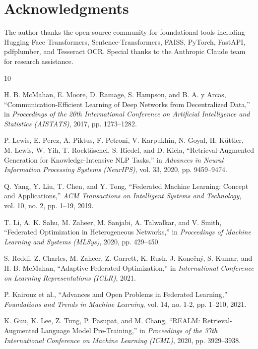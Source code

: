 \documentclass[conference]{IEEEtran}
\begin{document}
\section*{Acknowledgments}

The author thanks the open-source community for foundational tools including Hugging Face Transformers, Sentence-Transformers, FAISS, PyTorch, FastAPI, pdfplumber, and Tesseract OCR. Special thanks to the Anthropic Claude team for research assistance.

\begin{thebibliography}{10}

H. B. McMahan, E. Moore, D. Ramage, S. Hampson, and B. A. y Arcas,
``Communication-Efficient Learning of Deep Networks from Decentralized Data,''
in \textit{Proceedings of the 20th International Conference on Artificial Intelligence and Statistics (AISTATS)}, 2017, pp. 1273--1282.

P. Lewis, E. Perez, A. Piktus, F. Petroni, V. Karpukhin, N. Goyal, H. Küttler, M. Lewis, W. Yih, T. Rocktäschel, S. Riedel, and D. Kiela,
``Retrieval-Augmented Generation for Knowledge-Intensive NLP Tasks,''
in \textit{Advances in Neural Information Processing Systems (NeurIPS)}, vol. 33, 2020, pp. 9459--9474.

Q. Yang, Y. Liu, T. Chen, and Y. Tong,
``Federated Machine Learning: Concept and Applications,''
\textit{ACM Transactions on Intelligent Systems and Technology}, vol. 10, no. 2, pp. 1--19, 2019.

T. Li, A. K. Sahu, M. Zaheer, M. Sanjabi, A. Talwalkar, and V. Smith,
``Federated Optimization in Heterogeneous Networks,''
in \textit{Proceedings of Machine Learning and Systems (MLSys)}, 2020, pp. 429--450.

S. Reddi, Z. Charles, M. Zaheer, Z. Garrett, K. Rush, J. Konečný, S. Kumar, and H. B. McMahan,
``Adaptive Federated Optimization,''
in \textit{International Conference on Learning Representations (ICLR)}, 2021.

P. Kairouz et al.,
``Advances and Open Problems in Federated Learning,''
\textit{Foundations and Trends in Machine Learning}, vol. 14, no. 1-2, pp. 1--210, 2021.

K. Guu, K. Lee, Z. Tung, P. Pasupat, and M. Chang,
``REALM: Retrieval-Augmented Language Model Pre-Training,''
in \textit{Proceedings of the 37th International Conference on Machine Learning (ICML)}, 2020, pp. 3929--3938.


\end{thebibliography}
\end{document}
